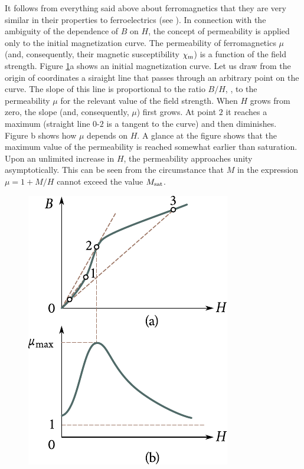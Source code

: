 It follows from everything said above about ferromagnetics that they are very similar in their properties to ferroelectrics (see ).
In connection with the ambiguity of the dependence of $B$ on $H$, the concept of permeability is applied only to the initial magnetization curve.
The permeability of ferromagnetics $\mu$ (and, consequently, their magnetic susceptibility $\chi_{\text{m}}$) is a function of the field strength.
Figure \ref{fig:7_19}a shows an initial magnetization curve.
Let us draw from the origin of coordinates a siraight line that passes through an arbitrary point on the curve.
The slope of this line is proportional to the ratio $B/H$, \ie, to the permeability $\mu$ for the relevant value of the field strength.
When $H$ grows from zero, the slope (and, consequently, $\mu$) first grows. At point $2$ it reaches a maximum (straight line $0$-$2$ is a tangent to the curve) and then diminishes.
Figure b shows how $\mu$ depends on $H$.
A glance at the figure shows that the maximum value of the permeability is reached somewhat earlier than saturation.
Upon an unlimited increase in $H$, the permeability
approaches unity asymptotically.
This can be seen from the circumstance that $M$ in the expression $\mu=1+M/H$ cannot exceed the value $M_{\text{sat}}$.

\begin{figure}[t]
	\begin{center}
		\includegraphics[scale=1]{figures/ch_07/fig_7_19.pdf}
		\caption[]{}
		\label{fig:7_19}
	\end{center}
	\vspace{-0.8cm}
\end{figure}

